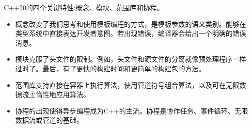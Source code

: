 C++20的四个关键特性:概念、模块、范围库和协程。

\begin{itemize}
\item 
概念改变了我们思考和使用模板编程的方式，是模板参数的语义类别。能够在类型系统中直接表达开发者意图。若出现错误，编译器会给出一个明确的错误消息。

\item 
模块克服了头文件的限制。例如，头文件和源文件的分离就像预处理程序一样过时了。最后，有了更快的构建时间和更简单的构建包的方法。

\item 
范围库支持直接在容器上执行算法，使用管道符号组合算法，以及可在无限数据流上惰性地应用算法。

\item 
协程的出现使得异步编程成为C++的主流。协程是协作任务、事件循环、无限数据流或管道的基础。
\end{itemize}